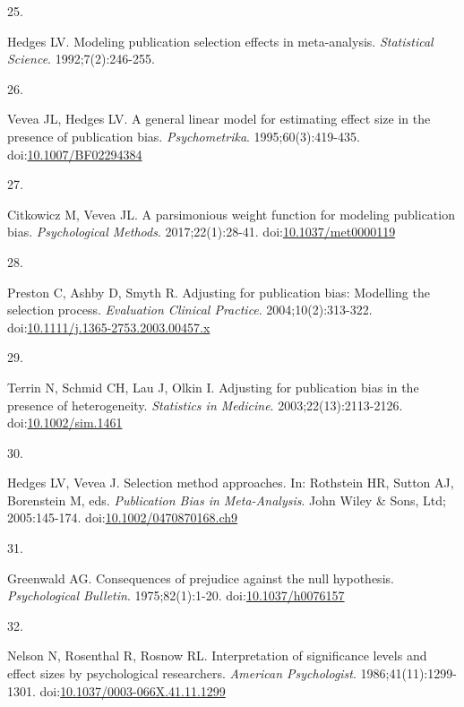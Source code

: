 \documentclass[
  american,
  man, donotrepeattitle,floatsintext]{apa7}
\newlength{\cslhangindent}
\newlength{\csllabelwidth}
\newenvironment{CSLReferences}[2] %
 {\begin{list}{}{%
  \setlength{\itemindent}{0pt}
  \setlength{\leftmargin}{0pt}
  \setlength{\parsep}{0pt}
  \ifodd #1
   \setlength{\leftmargin}{\cslhangindent}
   \setlength{\itemindent}{-1\cslhangindent}
  \fi
  \setlength{\itemsep}{#2\baselineskip}}}
 {\end{list}}
\newcommand{\CSLLeftMargin}[1]{\parbox[t]{\csllabelwidth}{\strut#1\strut}}
\newcommand{\CSLRightInline}[1]{\parbox[t]{\linewidth - \csllabelwidth}{\strut#1\strut}}
\begin{document}
\begin{CSLReferences}{0}{1}
\CSLLeftMargin{25. }%
\CSLRightInline{Hedges LV. Modeling publication selection effects in meta-analysis. \emph{Statistical Science}. 1992;7(2):246-255.}

\CSLLeftMargin{26. }%
\CSLRightInline{Vevea JL, Hedges LV. A general linear model for estimating effect size in the presence of publication bias. \emph{Psychometrika}. 1995;60(3):419-435. doi:\href{https://doi.org/10.1007/BF02294384}{10.1007/BF02294384}}

\CSLLeftMargin{27. }%
\CSLRightInline{Citkowicz M, Vevea JL. {A parsimonious weight function for modeling publication bias}. \emph{Psychological Methods}. 2017;22(1):28-41. doi:\href{https://doi.org/10.1037/met0000119}{10.1037/met0000119}}

\CSLLeftMargin{28. }%
\CSLRightInline{Preston C, Ashby D, Smyth R. Adjusting for publication bias: Modelling the selection process. \emph{Evaluation Clinical Practice}. 2004;10(2):313-322. doi:\href{https://doi.org/10.1111/j.1365-2753.2003.00457.x}{10.1111/j.1365-2753.2003.00457.x}}

\CSLLeftMargin{29. }%
\CSLRightInline{Terrin N, Schmid CH, Lau J, Olkin I. Adjusting for publication bias in the presence of heterogeneity. \emph{Statistics in Medicine}. 2003;22(13):2113-2126. doi:\href{https://doi.org/10.1002/sim.1461}{10.1002/sim.1461}}

\CSLLeftMargin{30. }%
\CSLRightInline{Hedges LV, Vevea J. Selection method approaches. In: Rothstein HR, Sutton AJ, Borenstein M, eds. \emph{Publication Bias in Meta-Analysis}. {John Wiley \& Sons, Ltd}; 2005:145-174. doi:\href{https://doi.org/10.1002/0470870168.ch9}{10.1002/0470870168.ch9}}

\CSLLeftMargin{31. }%
\CSLRightInline{Greenwald AG. Consequences of prejudice against the null hypothesis. \emph{Psychological Bulletin}. 1975;82(1):1-20. doi:\href{https://doi.org/10.1037/h0076157}{10.1037/h0076157}}

\CSLLeftMargin{32. }%
\CSLRightInline{Nelson N, Rosenthal R, Rosnow RL. Interpretation of significance levels and effect sizes by psychological researchers. \emph{American Psychologist}. 1986;41(11):1299-1301. doi:\href{https://doi.org/10.1037/0003-066X.41.11.1299}{10.1037/0003-066X.41.11.1299}}


\end{CSLReferences}
\end{document}
